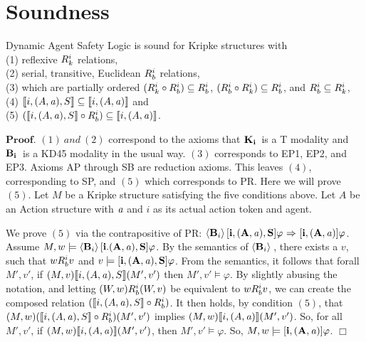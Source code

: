 \section{Soundness}
\begin{tcolorbox}
	\begin{theorem}[Soundness]
		Dynamic Agent Safety Logic is sound for Kripke structures with\\ (1) reflexive $R_{k}^i$ relations,\\ (2) serial, transitive, Euclidean $R_{b}^i$ relations, \\(3) which are partially ordered $(R_{k}^i \circ R_{b}^i) \subseteq R_{b}^i$, $(R_{b}^i \circ R_{k}^i) \subseteq R_{b}^i$, and $R_{b}^i \subseteq R_{k}^i$, \\(4) $\llbracket i,(A,\mathit{a}),S\rrbracket \subseteq \llbracket i,(A,\mathit{a})\rrbracket$%
		and\\ (5) $(\llbracket i,(A,\mathit{a}),S\rrbracket \circ R_{b}^i) \subseteq \llbracket i, (A,\mathit{a})\rrbracket$.
	\end{theorem}
\end{tcolorbox}
$\mathbf{Proof}.$ $(1)\  and\  (2)$ correspond to the axioms that $\mathbf{K}_{\mathbf{i}}\,$ is a T modality and $\mathbf{B}_{\mathbf{i}}\,$ is a KD45 modality in the usual way. $(3)$ corresponds to EP1, EP2, and EP3. Axioms AP through SB are reduction axioms. This leaves $(4)$, corresponding to SP, and $(5)$ which corresponds to PR. Here we will prove $(5)$. Let $M$ be a Kripke structure satisfying the five conditions above. Let $A$ be an Action structure with $\mathit{a}$ and $i$ as its actual action token and agent. 

We prove $(5)$ via the contrapositive of PR: $\langle \mathbf{B}_{i} \rangle\,\mathbf{[i,(A,\mathit{a}),S]}\varphi {\ \Rightarrow \ } \mathbf{[i, (A,\mathit{a})]}\varphi$.
Assume $M,w \models \langle \mathbf{B}_{i} \rangle\,\mathbf{[i.(A,\mathit{a}),S]}\varphi$. By the semantics of $\langle \mathbf{B}_{i} \rangle\,$, there exists a $v$, such that $wR_{b}^i v$ and $v \models \mathbf{[i,(A,\mathit{a}),S]}\varphi$. From the semantics, it follows that forall $M',v'$, if $(M,v)\llbracket i,(A,\mathit{a}),S\rrbracket (M',v')$ then $M',v' \models \varphi$. By slightly abusing the notation, and letting $(W,w)R_{b}^i (W,v)$ be equivalent to $wR_{b}^i v$, we can create the composed relation $(\llbracket i,(A,\mathit{a}),S\rrbracket \circ R_{b}^i)$. It then holds, by condition $(5)$, that $(M,w) (\llbracket i,(A,\mathit{a}),S\rrbracket \circ R_{b}^i) (M',v')$ implies $(M,w)\llbracket i, (A,\mathit{a})\rrbracket (M',v')$. So, for all $M',v'$, if $(M,w) \llbracket i,(A,\mathit{a})\rrbracket (M',v')$, then $M',v' \models \varphi$. So, $M,w \models \mathbf{[i,(A,\mathit{a})]}\varphi$. $\Box$

